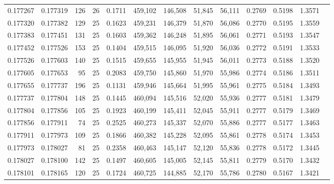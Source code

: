 \begin{tabular}{rrrrrrrrrrrrr}
0.177267 & 0.177319 &   126 &  26 &                                     0.1711 & 459,102 & 146,508 &  51,845 &  56,111 & 0.2769 & 0.5198 & 1.3571 \\
0.177320 & 0.177382 &   129 &  25 &                                     0.1623 & 459,231 & 146,379 &  51,870 &  56,086 & 0.2770 & 0.5195 & 1.3559 \\
0.177383 & 0.177451 &   131 &  25 &                                     0.1603 & 459,362 & 146,248 &  51,895 &  56,061 & 0.2771 & 0.5193 & 1.3547 \\
0.177452 & 0.177526 &   153 &  25 &                                     0.1404 & 459,515 & 146,095 &  51,920 &  56,036 & 0.2772 & 0.5191 & 1.3533 \\
0.177526 & 0.177603 &   140 &  25 &                                     0.1515 & 459,655 & 145,955 &  51,945 &  56,011 & 0.2773 & 0.5188 & 1.3520 \\
0.177605 & 0.177653 &    95 &  25 &                                     0.2083 & 459,750 & 145,860 &  51,970 &  55,986 & 0.2774 & 0.5186 & 1.3511 \\
0.177655 & 0.177737 &   196 &  25 &                                     0.1131 & 459,946 & 145,664 &  51,995 &  55,961 & 0.2775 & 0.5184 & 1.3493 \\
0.177737 & 0.177804 &   148 &  25 &                                     0.1445 & 460,094 & 145,516 &  52,020 &  55,936 & 0.2777 & 0.5181 & 1.3479 \\
0.177804 & 0.177856 &   105 &  25 &                                     0.1923 & 460,199 & 145,411 &  52,045 &  55,911 & 0.2777 & 0.5179 & 1.3469 \\
0.177856 & 0.177911 &    74 &  25 &                                     0.2525 & 460,273 & 145,337 &  52,070 &  55,886 & 0.2777 & 0.5177 & 1.3463 \\
0.177911 & 0.177973 &   109 &  25 &                                     0.1866 & 460,382 & 145,228 &  52,095 &  55,861 & 0.2778 & 0.5174 & 1.3453 \\
0.177973 & 0.178027 &    81 &  25 &                                     0.2358 & 460,463 & 145,147 &  52,120 &  55,836 & 0.2778 & 0.5172 & 1.3445 \\
0.178027 & 0.178100 &   142 &  25 &                                     0.1497 & 460,605 & 145,005 &  52,145 &  55,811 & 0.2779 & 0.5170 & 1.3432 \\
0.178101 & 0.178165 &   120 &  25 &                                     0.1724 & 460,725 & 144,885 &  52,170 &  55,786 & 0.2780 & 0.5167 & 1.3421 \\

\end{tabular}
